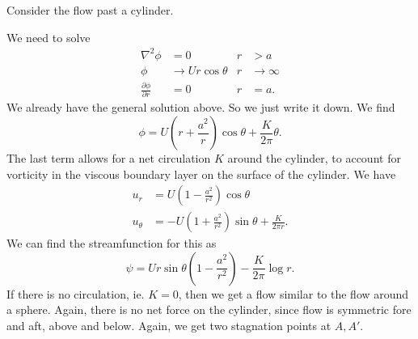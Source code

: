 \documentclass[a4paper]{article}
\begin{document}
\begin{eg}
  Consider the flow past a cylinder.
  \begin{center}
  \end{center}
  We need to solve
  \begin{align*}
    \nabla^2 \phi &= 0 & r &> a\\
    \phi &\to U r\cos \theta & r & \to \infty\\
    \frac{\partial \phi}{\partial r} &= 0 & r &= a.
  \end{align*}
  We already have the general solution above. So we just write it down. We find
  \[
    \phi = U\left(r + \frac{a^2}{r}\right) \cos \theta + \frac{K}{2\pi}\theta.
  \]
  The last term allows for a net circulation $K$ around the cylinder, to account for vorticity in the viscous boundary layer on the surface of the cylinder. We have
  \begin{align*}
    u_r &= U\left(1 - \frac{a^2}{r^2}\right) \cos \theta\\
    u_\theta &= -U \left(1 + \frac{a^2}{r^2}\right) \sin \theta + \frac{K}{2 \pi r}.
  \end{align*}
  We can find the streamfunction for this as
  \[
    \psi = Ur\sin \theta\left(1 - \frac{a^2}{r^2}\right) - \frac{K}{2\pi} \log r.
  \]
  If there is no circulation, ie. $K = 0$, then we get a flow similar to the flow around a sphere. Again, there is no net force on the cylinder, since flow is symmetric fore and aft, above and below. Again, we get two stagnation points at $A, A'$.
  \begin{center}
\end{center}
\end{eg}
\end{document}
